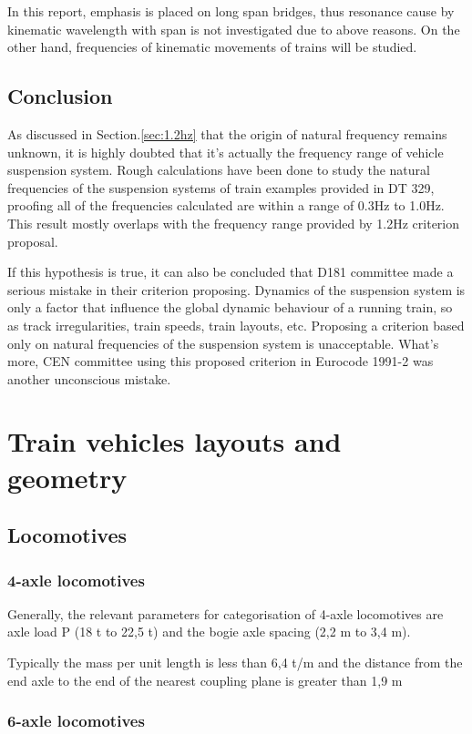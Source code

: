 In this report, emphasis is placed on long span bridges, thus resonance cause by kinematic wavelength with span is not investigated due to above reasons. On the other hand, frequencies of kinematic movements of trains will be studied. 

\section{Conclusion}
As discussed in Section.\ref{sec:1.2hz} that the origin of natural frequency remains unknown, it is highly doubted that it's actually the frequency range of vehicle suspension system. Rough calculations have been done to study the natural frequencies of the suspension systems of train examples provided in DT 329, proofing all of the frequencies calculated are within a range of 0.3Hz to 1.0Hz. This result mostly overlaps with the frequency range provided by 1.2Hz criterion proposal. 

If this hypothesis is true, it can also be concluded that D181 committee made a serious mistake in their criterion proposing. Dynamics of the suspension system is only a factor that influence the global dynamic behaviour of a running train, so as track irregularities, train speeds, train layouts, etc. Proposing a criterion based only on natural frequencies of the suspension system is unacceptable. What's more, CEN committee using this proposed criterion in Eurocode 1991-2 was another unconscious mistake.


\chapter{Train vehicles layouts and geometry}



\section{Locomotives}
\subsection{4-axle locomotives}
Generally, the relevant parameters for categorisation of 4-axle locomotives are axle load P (18 t to 22,5 t) and the bogie axle spacing (2,2 m to 3,4 m).

Typically the mass per unit length is less than 6,4 t/m and the distance from the end axle to the end of the nearest coupling plane is greater than 1,9 m

\subsection{6-axle locomotives}

